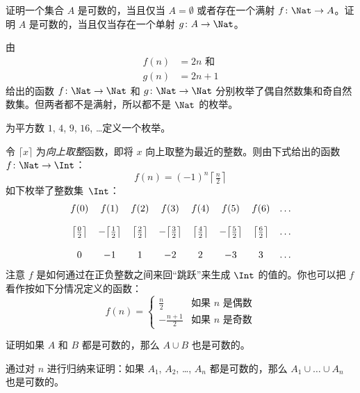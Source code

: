 \documentclass[../../../include/open-logic-section]{subfiles}
\begin{document}
\begin{prob}
证明一个集合 $A$ 是可数的，当且仅当 $A = \emptyset$ 或者存在一个满射 $f\colon \Nat \to A$。证明 $A$ 是可数的，当且仅当存在一个单射 $g\colon A \to \Nat$。
\end{prob}

\begin{ex}
由
\begin{align*}
  f(n) & = 2n \text{ 和}\\
  g(n) & = 2n+1
\end{align*}
给出的函数 $f\colon \Nat \to \Nat$ 和 $g \colon \Nat \to \Nat$ 分别枚举了偶自然数集和奇自然数集。但两者都不是满射，所以都不是 $\Nat$ 的枚举。
\end{ex}

\begin{prob}
为平方数 $1$, $4$, $9$, $16$, \dots 定义一个枚举。
\end{prob}

\begin{ex}
令 $\lceil x \rceil$ 为\emph{向上取整}函数，即将 $x$ 向上取整为最近的整数。则由下式给出的函数 $f \colon \Nat \to \Int$：
\[
  f(n) = (-1)^{n} \left\lceil\tfrac{n}{2}\right\rceil
\]
如下枚举了整数集~$\Int$：
\[
\begin{array}{c c c c c c c c}
f(0) & f(1) & f(2) & f(3) & f(4) & f(5) & f(6) & \dots \\ \\
\big\lceil \tfrac{0}{2} \big\rceil & -\big\lceil \tfrac{1}{2}\big\rceil &  \big\lceil \tfrac{2}{2} \big\rceil & -\big\lceil \tfrac{3}{2} \big\rceil & \big\lceil \tfrac{4}{2} \big\rceil  & -\big\lceil \tfrac{5}{2}\big\rceil & \big\lceil \tfrac{6}{2} \big\rceil & \dots \\ \\
0 & -1 & 1 & -2 & 2 & -3 & 3& \dots
\end{array}
\]
注意 $f$ 是如何通过在正负整数之间来回“跳跃”来生成 $\Int$ 的值的。你也可以把 $f$ 看作按如下分情况定义的函数：
\[
f(n) = \begin{cases}
  \frac{n}{2} & \text{如果 $n$ 是偶数}\\
  -\frac{n+1}{2} & \text{如果 $n$ 是奇数}
  \end{cases}
\]
\end{ex}

\begin{prob}
证明如果 $A$ 和 $B$ 都是可数的，那么 $A \cup B$ 也是可数的。
\end{prob}

\begin{prob}
通过对 $n$ 进行归纳来证明：如果 $A_1$, $A_2$, \dots, $A_n$ 都是可数的，那么 $A_1 \cup \dots \cup A_n$ 也是可数的。
\end{prob}
\end{document}

